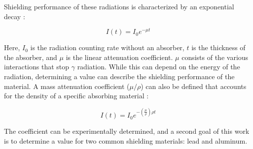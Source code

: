 Shielding performance of these radiations is characterized by an exponential decay \cite{knoll}:

\begin{equation}
I(t) = I_{0}e^{-\mu t}
\end{equation}

Here, $I_{0}$ is the radiation counting rate without an absorber, $t$ is the thickness of the absorber, and $\mu$ is the linear attenuation coefficient. $\mu$ consists of the various interactions that stop $\gamma$ radiation. While this can depend on the energy of the radiation, determining a value can describe the shielding performance of the material. A mass attenuation coefficient ($\mu/\rho$) can also be defined that accounts for the density of a specific absorbing material \cite{knoll}:

\begin{equation}
I(t) = I_{0}e^{-(\frac{\mu}{\rho})\rho t}
\label{eq:decay}
\end{equation}

The coefficient can be experimentally determined, and a second goal of this work is to determine a value for two common shielding materials: lead and aluminum.
